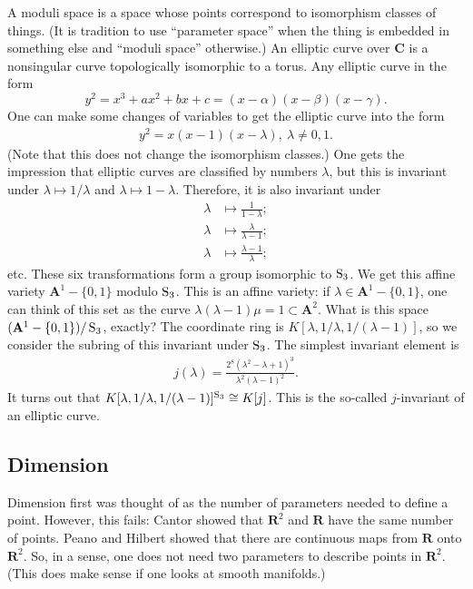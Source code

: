 \documentclass [11 pt, oneside, margin = 1 in] {article}
\begin{document}
\fi
\begin{example}\label{}\text{}
A moduli space is a space whose points correspond to isomorphism classes of things. (It is tradition to use ``parameter space'' when the thing is embedded in something else and ``moduli space'' otherwise.) An elliptic curve over $\mathbf{C}$ is a nonsingular curve topologically isomorphic to a torus. Any elliptic curve in the form \[ y^2=x^3+ax^2+bx+c = (x-\alpha) (x-\beta) (x-\gamma).\] One can make some changes of variables to get the elliptic curve into the form
\begin{align*}
	y^2 = x(x-1) (x-\lambda),\ \lambda \ne 0,1.
\end{align*}
(Note that this does not change the isomorphism classes.) One gets the impression that elliptic curves are classified by numbers $\lambda$, but this is invariant under $\lambda\longmapsto 1/\lambda$ and $\lambda \longmapsto 1-\lambda$. Therefore, it is also invariant under
\begin{align*}
	\lambda &\longmapsto \frac{1}{1-\lambda};\\
	\lambda&\longmapsto \frac{\lambda}{\lambda-1};\\
	\lambda&\longmapsto \frac{\lambda-1}{\lambda};
\end{align*}
etc. These six transformations form a group isomorphic to $\operatorname{S}_3$. We get this affine variety $\mathbf{A}^1 - \{0,1\}$ modulo $\operatorname{S}_3$. This is an affine variety: if $\lambda\in \mathbf{A}^1-\{0,1\}$, one can think of this set as the curve $\lambda(\lambda-1)\mu = 1\subset\mathbf{A}^2$. What is this space $(\mathbf{A}^1 - \{0,1\}) / \operatorname{S}_3$, exactly? The coordinate ring is $K[\lambda, 1/\lambda, 1/(\lambda-1)]$, so we consider the subring of this invariant under $\operatorname{S}_3$. The simplest invariant element is 
\begin{align*}
	j(\lambda) =  \frac{2^8(\lambda^2-\lambda+1)^3}{\lambda^2(\lambda-1)^2}.
\end{align*}
It turns out that $K[\lambda, 1/\lambda, 1/(\lambda-1)]^{\operatorname{S}_3} \cong K[j]$. This is the so-called $j$-invariant of an elliptic curve.
\end{example}


\subsection{Dimension}
Dimension first was thought of as the number of parameters needed to define a point. However, this fails: Cantor showed that $\mathbf{R}^2$ and $\mathbf{R}$ have the same number of points. Peano and Hilbert showed that there are continuous maps from $\mathbf{R}$ onto $\mathbf{R}^2$. So, in a sense, one does not need two parameters to describe points in $\mathbf{R}^2$. (This does make sense if one looks at smooth manifolds.)
\end{document}
